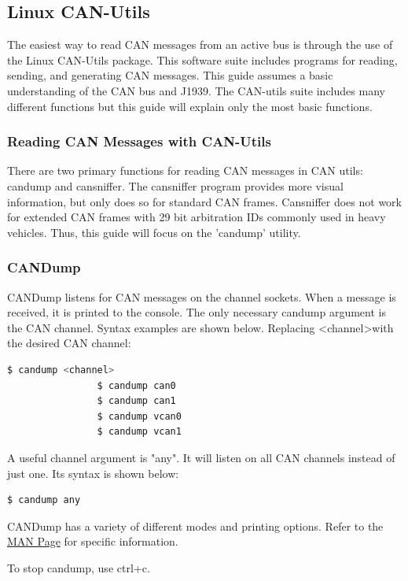     \subsection{Linux CAN-Utils}
        The easiest way to read CAN messages from an active bus is through the use of the Linux CAN-Utils package. This software suite includes programs for reading, sending, and generating CAN messages. This guide assumes a basic understanding of the CAN bus and J1939. The CAN-utils suite includes many different functions but this guide will explain only the most basic functions.
        \subsubsection{Reading CAN Messages with CAN-Utils}
            There are two primary functions for reading CAN messages in CAN utils: candump and cansniffer. The cansniffer program provides more visual information, but only does so for standard CAN frames. Cansniffer does not work for extended CAN frames with 29 bit arbitration IDs commonly used in heavy vehicles. Thus, this guide will focus on the 'candump' utility.
        \subsubsection{CANDump}
            CANDump listens for CAN messages on the channel sockets. When a message is received, it is printed to the console. The only necessary candump argument is the CAN channel. Syntax examples are shown below. Replacing \textless channel\textgreater  with the desired CAN channel:
            \begin{lstlisting}[language=bash, autogobble=true]
                $ candump <channel>
                $ candump can0
                $ candump can1
                $ candump vcan0
                $ candump vcan1
            \end{lstlisting}
            A useful channel argument is "any". It will listen on all CAN channels instead of just one. Its syntax is shown below:
            \begin{lstlisting}[language=bash, autogobble=true]
                $ candump any
            \end{lstlisting}
            CANDump has a variety of different modes and printing options. Refer to the \href{https://manpages.debian.org/testing/can-utils/candump.1.en.html}{MAN Page} for specific information.
            
            To stop candump, use ctrl+c.
            
